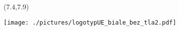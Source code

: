 {\begin{frame}[standout]
\begin{textblock}{3.2}
    \end{textblock}



    \begin{textblock}{4.2}(7.4,7.9)

      \texttt{[image: ./pictures/logotypUE\_biale\_bez\_tla2.pdf]}

    \end{textblock}


  \end{frame}





  \begin{frame}[standout]


    \begingroup

    \color{jStrongWhite}

    #1

    \endgroup

  \end{frame}
}






\newcommand{\beamermathcolor}[2]{{\color{#1}\setbeamercolor{math text}
    {fg=#1} #2}}

\newcommand{\normaltextcolor}[1]{{\color{normal text.fg}{#1}}}

\newcommand{\beamermathcolorwhite}[1]{{\color{jStrongWhite}
    \setbeamercolor{math text}{fg=jStrongWhite} #1}}

\newcommand{\alertmath}[1]{{\color{jDarkOrange} \setbeamercolor{math
      text}{fg=jDarkOrange} #1}}








